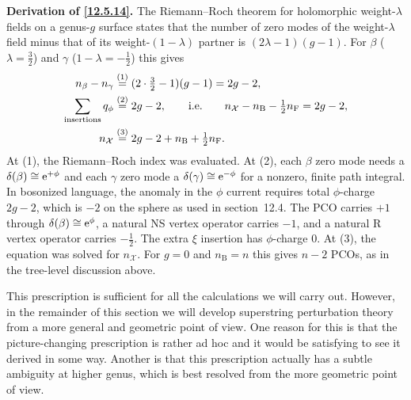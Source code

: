 \begin{tcolorbox}[breakable]
	\begin{remark}
		\textbf{Derivation of \eqref{12.5.14}.} The Riemann--Roch theorem for holomorphic weight-$\lambda$ fields on a genus-$g$ surface states that the number of zero modes of the weight-$\lambda$ field minus that of its weight-$(1-\lambda)$ partner is $(2\lambda-1)(g-1)$. For $\beta$ ($\lambda=\frac32$) and $\gamma$ ($1-\lambda=-\frac12$) this gives
		\begin{align*}
			n_{\beta}-n_{\gamma}&\overset{(1)}{=} (2\cdot\tfrac32-1)(g-1)=2g-2 ,\\
			\sum_{\text{insertions}}q_{\phi}&\overset{(2)}{=} 2g-2 ,\qquad\text{i.e.}\qquad n_{\mathcal X}-n_{\mathrm B}-\tfrac12n_{\mathrm F}=2g-2 ,\\
			n_{\mathcal X}&\overset{(3)}{=} 2g-2+n_{\mathrm B}+\tfrac12n_{\mathrm F} .
		\end{align*}
		At (1), the Riemann--Roch index was evaluated. At (2), each $\beta$ zero mode needs a $\delta(\beta)\cong\mathrm{e}^{+\phi}$ and each $\gamma$ zero mode a $\delta(\gamma)\cong\mathrm{e}^{-\phi}$ for a nonzero, finite path integral. In bosonized language, the anomaly in the $\phi$ current requires total $\phi$-charge $2g-2$, which is $-2$ on the sphere as used in section~12.4. The PCO carries $+1$ through $\delta(\beta)\cong\mathrm{e}^{\phi}$, a natural NS vertex operator carries $-1$, and a natural R vertex operator carries $-\frac12$. The extra $\xi$ insertion has $\phi$-charge $0$. At (3), the equation was solved for $n_{\mathcal X}$. For $g=0$ and $n_{\mathrm B}=n$ this gives $n-2$ PCOs, as in the tree-level discussion above.
	\end{remark}
\end{tcolorbox}

This prescription is sufficient for all the calculations we will carry out. However, in the remainder of this section we will develop superstring perturbation theory from a more general and geometric point of view. One reason for this is that the picture-changing prescription is rather ad hoc and it would be satisfying to see it derived in some way. Another is that this prescription actually has a subtle ambiguity at higher genus, which is best resolved from the more geometric point of view.

